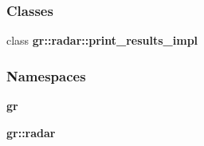 \subsubsection*{Classes}
\begin{DoxyCompactItemize}
\item 
class {\bf gr\+::radar\+::print\+\_\+results\+\_\+impl}
\end{DoxyCompactItemize}
\subsubsection*{Namespaces}
\begin{DoxyCompactItemize}
\item 
 {\bf gr}
\item 
 {\bf gr\+::radar}
\end{DoxyCompactItemize}

